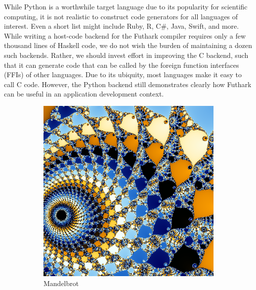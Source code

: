 While Python is a worthwhile target language due to its popularity for
scientific computing, it is not realistic to construct code generators
for all languages of interest.  Even a short list might include Ruby,
R, C\#, Java, Swift, and more.  While writing a host-code backend for
the Futhark compiler requires only a few thousand lines of Haskell
code, we do not wish the burden of maintaining a dozen such backends.
Rather, we should invest effort in improving the C backend, such that
it can generate code that can be called by the foreign function
interfaces (FFIs) of other languages.  Due to its ubiquity, most
languages make it easy to call C code.  However, the Python backend
still demonstrates clearly how Futhark can be useful in an application
development context.

\begin{figure}
  \begin{subfigure}{0.24\textwidth}
    \includegraphics[width=\textwidth]{img/mandelbrot.png}
    \caption{Mandelbrot}
    \label{fig:mandelbrot}
  \end{subfigure}
  \begin{subfigure}{0.24\textwidth}

\end{subfigure}
\end{figure}
